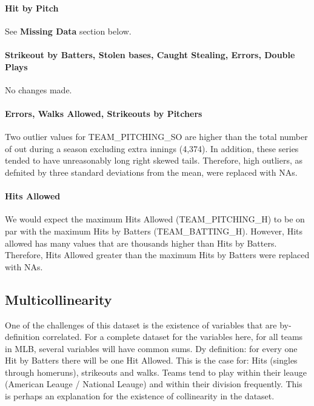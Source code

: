 \documentclass[]{article}
\let\oldparagraph\paragraph
\renewcommand{\paragraph}[1]{\oldparagraph{#1}\mbox{}}
\begin{document}
\paragraph{Hit by Pitch}\label{hit-by-pitch}

See \textbf{Missing Data} section below.

\paragraph{Strikeout by Batters, Stolen bases, Caught Stealing, Errors,
Double
Plays}\label{strikeout-by-batters-stolen-bases-caught-stealing-errors-double-plays}

No changes made.

\paragraph{Errors, Walks Allowed, Strikeouts by
Pitchers}\label{errors-walks-allowed-strikeouts-by-pitchers}

Two outlier values for TEAM\_PITCHING\_SO are higher than the total
number of out during a season excluding extra innings (4,374). In
addition, these series tended to have unreasonably long right skewed
tails. Therefore, high outliers, as defnited by three standard
deviations from the mean, were replaced with NAs.

\paragraph{Hits Allowed}\label{hits-allowed}

We would expect the maximum Hits Allowed (TEAM\_PITCHING\_H) to be on
par with the maximum Hits by Batters (TEAM\_BATTING\_H). However, Hits
allowed has many values that are thousands higher than Hits by Batters.
Therefore, Hits Allowed greater than the maximum Hits by Batters were
replaced with NAs.

\subsection{Multicollinearity}\label{multicollinearity}

One of the challenges of this dataset is the existence of variables that
are by-definition correlated. For a complete dataset for the variables
here, for all teams in MLB, several variables will have common sums. Dy
definition: for every one Hit by Batters there will be one Hit Allowed.
This is the case for: Hits (singles through homeruns), strikeouts and
walks. Teams tend to play within their leauge (American Leauge /
National Leauge) and within their division frequently. This is perhaps
an explanation for the existence of collinearity in the dataset.
\end{document}

